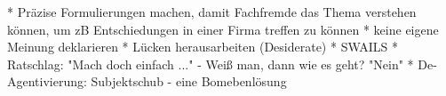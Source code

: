* Präzise Formulierungen machen, damit Fachfremde das Thema verstehen können, um zB Entschiedungen in einer Firma treffen zu können
* keine eigene Meinung deklarieren
* Lücken herausarbeiten (Desiderate)
* SWAILS
* Ratschlag: "Mach doch einfach ..." - Weiß man, dann wie es geht? "Nein"
* De-Agentivierung: Subjektschub - eine Bomebenlösung